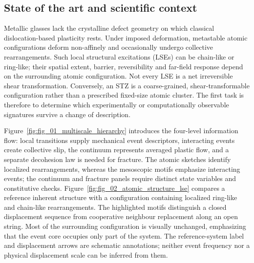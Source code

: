 \documentclass[11pt,a4paper]{article}
\begin{document}
\subsection{State of the art and scientific context}
Metallic glasses lack the crystalline defect geometry on which classical dislocation-based plasticity rests. Under imposed deformation, metastable atomic configurations deform non-affinely and occasionally undergo collective rearrangements. Such local structural excitations (LSEs) can be chain-like or ring-like; their spatial extent, barrier, reversibility and far-field response depend on the surrounding atomic configuration. Not every LSE is a net irreversible shear transformation. Conversely, an STZ is a coarse-grained, shear-transformable configuration rather than a prescribed fixed-size atomic cluster. The first task is therefore to determine which experimentally or computationally observable signatures survive a change of description.

Figure~\ref{fig:fig_01_multiscale_hierarchy} introduces the four-level information flow: local transitions supply mechanical event descriptors, interacting events create collective slip, the continuum represents averaged plastic flow, and a separate decohesion law is needed for fracture. The atomic sketches identify localized rearrangements, whereas the mesoscopic motifs emphasize interacting events; the continuum and fracture panels require distinct state variables and constitutive checks. Figure~\ref{fig:fig_02_atomic_structure_lse} compares a reference inherent structure with a configuration containing localized ring-like and chain-like rearrangements. The highlighted motifs distinguish a closed displacement sequence from cooperative neighbour replacement along an open string. Most of the surrounding configuration is visually unchanged, emphasizing that the event core occupies only part of the system. The reference-system label and displacement arrows are schematic annotations; neither event frequency nor a physical displacement scale can be inferred from them. 
\end{document}
